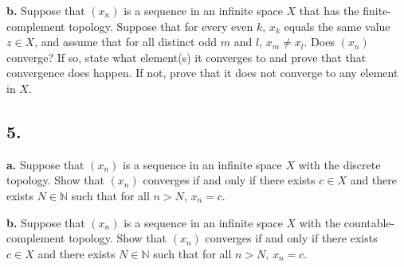 \documentclass{amsart}
\theoremstyle{plain}
\theoremstyle{definition}
\theoremstyle{remark}
\begin{document}
\vspace{.1in}
{\bfseries b.} Suppose that $(x_n)$ is a sequence in an infinite space $X$ that has the finite-complement topology. Suppose that for every even $k$, $x_k$ equals the same value $z\in X$, and assume that for all distinct odd $m$ and $l$, $x_m \ne x_l$. Does $(x_n)$ converge? If so, state what element(s) it converges to and prove that that convergence does happen. If not, prove that it does not converge to any element in $X$.




\vspace{.15in}

\noindent
\subsection*{5.}

{\bfseries a.} Suppose that $(x_n)$ is a sequence in an infinite space $X$ with the discrete topology. Show that $(x_n)$ converges if and only if there exists $c\in X$ and there exists $N\in \mathbb N$ such that for all $n > N$, $x_n = c$.


\vspace{.1in}
{\bfseries b.} Suppose that $(x_n)$ is a sequence in an infinite space $X$ with the countable-complement topology. Show that $(x_n)$ converges if and only if there exists $c\in X$ and there exists $N\in \mathbb N$ such that for all $n > N$, $x_n = c$.
\end{document}
